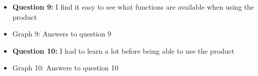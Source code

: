 \documentclass{article}
\begin{document}
\newpage
\begin{itemize}
		\item[] \textbf{Question 9:} I find it easy to see what functions are available when using the product
		\item[] \begin{minipage}[t]{\linewidth}
         	 \raggedright
          	\medskip
          	\centerline{Graph 9: Answers to question 9}
          \end{minipage}
\end{itemize}
\begin{itemize}
		\item[] \textbf{Question 10:} I had to learn a lot before being able to use the product
		\item[] \begin{minipage}[t]{\linewidth}
         	 \raggedright
          	\medskip
          	\centerline{Graph 10: Answers to question 10}
          \end{minipage}
\end{itemize}
\end{document}

